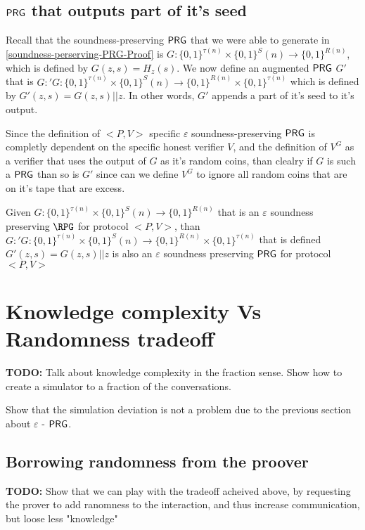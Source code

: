 \documentclass[11]{article}
\begin{document}
\subsection{$\mathsf{PRG}$ that outputs part of it's seed}

Recall that the soundness-preserving $\mathsf{PRG}$ that we were able to generate in \ref{soundness-perserving-PRG-Proof} is $G:\{0,1\}^{\tau(n)} \times \{0,1\}^S(n) \to \{0,1\}^{R(n)}$, which is defined by $G(z, s) = H_z(s)$. We now define an augmented $\mathsf{PRG}$ $G'$ that is $G:' G:\{0,1\}^{\tau(n)} \times \{0,1\}^S(n) \to \{0,1\}^{R(n)} \times \{0,1\}^{\tau(n)}$ which is defined by $G'(z,s) = G(z,s)||z$. In other words, $G'$ appends a part of it's seed to it's output.

Since the definition of $<P,V>$ specific $\varepsilon$ soundness-preserving $\mathsf{PRG}$ is completly dependent on the specific honest verifier $V$, and the definition of $V^G$ as a verifier that uses the output of $G$ as it's random coins, than clealry if $G$ is such a $\mathsf{PRG}$ than so is $G'$ since can we define $V^G$ to ignore all random coins that are on it's tape that are excess.

\begin{claim}

Given $G:\{0,1\}^{\tau(n)} \times \{0,1\}^S(n) \to \{0,1\}^{R(n)}$ that is an $\varepsilon$ soundness preserving $\RPG$ for protocol $<P,V>$, than $G:' G:\{0,1\}^{\tau(n)} \times \{0,1\}^S(n) \to \{0,1\}^{R(n)} \times \{0,1\}^{\tau(n)}$ that is defined $G'(z,s) = G(z,s)||z$ is also an $\varepsilon$ soundness preserving $\mathsf{PRG}$ for protocol $<P,V>$

\end{claim}

\section{Knowledge complexity Vs Randomness tradeoff}
\textbf{TODO:}
Talk about knowledge complexity in the fraction sense. Show how to create a simulator to a fraction of the conversations.

Show that the simulation deviation is not a problem due to the previous section about $\varepsilon$ - $\mathsf{PRG}$.

\subsection{Borrowing randomness from the proover}
\textbf{TODO:}
Show that we can play with the tradeoff acheived above, by requesting the prover to add ranomness to the interaction, and thus increase communication, but loose less "knowledge"
\end{document}
